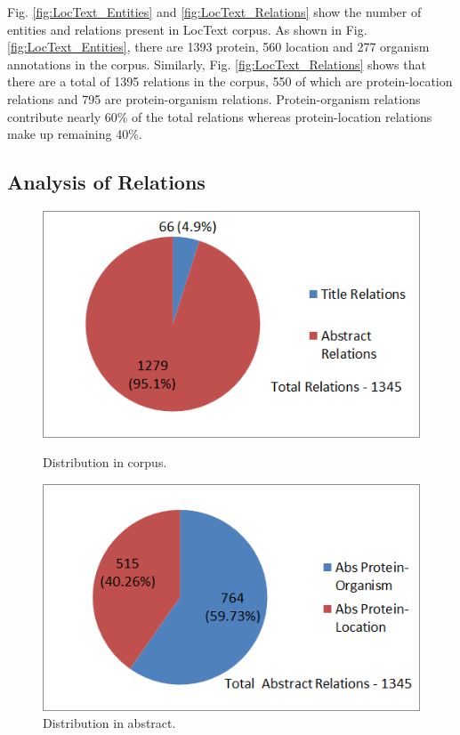 Fig. \ref{fig:LocText_Entities} and \ref{fig:LocText_Relations} show the number of entities and relations present in LocText corpus. As shown in  Fig. \ref{fig:LocText_Entities}, there are 1393 protein, 560 location and 277 organism annotations in the corpus. Similarly, Fig. \ref{fig:LocText_Relations} shows that there are a total of 1395 relations in the corpus, 550 of which are protein-location relations and 795 are protein-organism relations. Protein-organism relations contribute nearly 60\% of the total relations whereas protein-location relations make up remaining 40\%.

\subsection*{Analysis of Relations}

\begin{figure}
\centering
\begin{minipage}{.5\textwidth}
  \centering
  \includegraphics[width=.95\textwidth]{figures/Rel_Title_Abs_Distribution.png}
  \caption{Distribution in corpus.}
  \label{fig:Rel_Title_Abs}
\end{minipage}%
\begin{minipage}{.5\textwidth}
  \centering
  \includegraphics[width=.95\textwidth]{figures/AbsRel_PO_PL_Distribution.png}
  \caption{Distribution in abstract.}
  \label{fig:Rel_Abs_PO_PL}
\end{minipage}
\end{figure}

